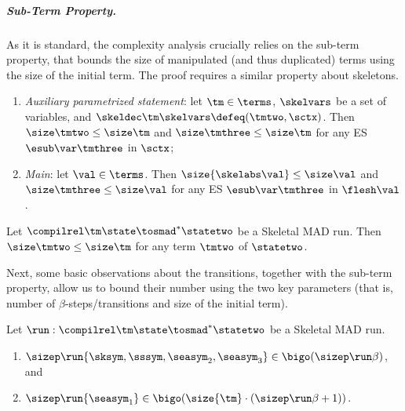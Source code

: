 \subparagraph{Sub-Term Property.} As it is standard, the complexity analysis crucially relies on the sub-term property, that bounds the size of manipulated (and thus duplicated) terms using the size of the initial term. The proof requires a similar property about skeletons.
\begin{toappendix}
\begin{lemma}
\label{l:skeleton-size}\hfill
\begin{enumerate}
\item \emph{Auxiliary parametrized statement}: let $\tm \in \terms$, $\skelvars$
  be a set of variables, and $\skeldec\tm\skelvars \defeq (\tmtwo,\sctx)$. Then
  $\size\tmtwo \leq \size\tm$ and $\size\tmthree \leq\size\tm$ for any ES $\esub\var\tmthree$ in $\sctx$;
\item \emph{Main}: let $\val\in\terms$. Then $\size{\skelabs\val} \leq \size\val$ and $\size\tmthree \leq\size\val$ for any ES $\esub\var\tmthree$ in $\flesh\val$.
\end{enumerate}
\end{lemma}
\end{toappendix}

\begin{toappendix}
\begin{lemma}
\label{l:sub-term}
Let $\compilrel\tm\state \tosmad^*\statetwo$ be a Skeletal MAD run. Then $\size\tmtwo\leq\size\tm$ for any term $\tmtwo$ of $\statetwo$.
\end{lemma}
\end{toappendix}

Next, some basic observations about the transitions, together with the sub-term property, allow us to bound their number using the two key parameters (that is, number of $\beta$-steps/transitions and size of the initial term).



\begin{proposition}

Let $\run:\compilrel\tm\state \tosmad^*\statetwo$ be a Skeletal MAD run. 
\begin{enumerate}
\item $\sizep\run{\sksym, \sssym, \seasym_2, \seasym_3}\in\bigo(\sizep\run\beta)$, and 
\item $\sizep\run{\seasym_1}\in\bigo(\size{\tm}\cdot(\sizep\run\beta +1))$.
\end{enumerate}
\end{proposition}


